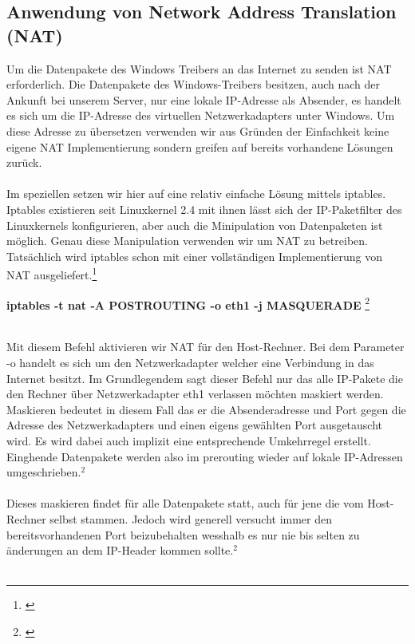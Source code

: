 \subsection{Anwendung von Network Address Translation (NAT)}
Um die Datenpakete des Windows Treibers an das Internet zu senden ist NAT erforderlich. Die Datenpakete des Windows-Treibers besitzen, auch nach der Ankunft bei unserem Server, nur eine lokale IP-Adresse als Absender, es handelt es sich um die IP-Adresse des virtuellen Netzwerkadapters unter Windows. Um diese Adresse zu übersetzen verwenden wir aus Gründen der Einfachkeit keine eigene NAT Implementierung sondern greifen auf bereits vorhandene Lösungen zurück. 
\\\\ 
Im speziellen setzen wir hier auf eine relativ einfache Lösung mittels iptables.
Iptables existieren seit Linuxkernel 2.4 mit ihnen lässt sich der IP-Paketfilter des Linuxkernels konfigurieren, aber auch die Minipulation von Datenpaketen ist möglich. Genau diese Manipulation verwenden wir um NAT zu betreiben. Tatsächlich wird iptables schon mit einer vollständigen Implementierung von NAT ausgeliefert.\footnote[1]{\cite[Vgl.][]{SRV19}}
\\ %
\begin{center}
    \textbf{iptables -t nat -A POSTROUTING -o eth1 -j MASQUERADE} \footnote[2]{\cite[Vgl.][]{SRV20}}
\end{center}
\ \\ 
Mit diesem Befehl aktivieren wir NAT für den Host-Rechner. Bei dem Parameter -o handelt es sich um den Netzwerkadapter welcher eine Verbindung in das Internet besitzt. Im Grundlegendem sagt dieser Befehl nur das alle IP-Pakete die den Rechner über Netzwerkadapter eth1 verlassen möchten maskiert werden. Maskieren bedeutet in diesem Fall das er die Absenderadresse und Port gegen die Adresse des Netzwerkadapters und einen eigens gewählten Port ausgetauscht wird. Es wird dabei auch implizit eine entsprechende Umkehrregel erstellt. Einghende Datenpakete werden also im prerouting wieder auf lokale IP-Adressen umgeschrieben.$^{2}$ %
\\\\
Dieses maskieren findet für alle Datenpakete statt, auch für jene die vom Host-Rechner selbst stammen. Jedoch wird generell versucht immer den bereitsvorhandenen Port beizubehalten wesshalb es nur nie bis selten zu änderungen an dem IP-Header kommen sollte.$^{2}$
\\\\ 
